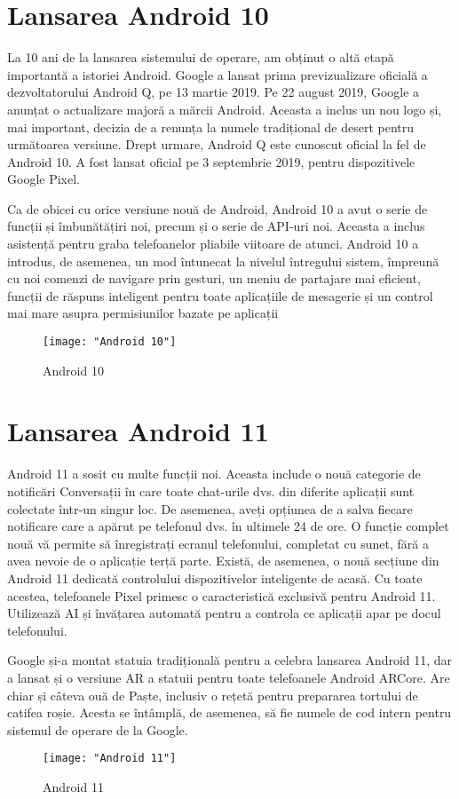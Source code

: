 \documentclass[a4paper,12pt]{amsbook}
\begin{document}
\chapter{\Large Lansarea Android 10}
\par
La 10 ani de la lansarea sistemului de operare, am obținut o altă etapă importantă a istoriei Android. Google a lansat prima previzualizare oficială a dezvoltatorului Android Q, pe 13 martie 2019. Pe 22 august 2019, Google a anunțat o actualizare majoră a mărcii Android. Aceasta a inclus un nou logo și, mai important, decizia de a renunța la numele tradițional de desert pentru următoarea versiune. Drept urmare, Android Q este cunoscut oficial la fel de Android 10. A fost lansat oficial pe 3 septembrie 2019, pentru dispozitivele Google Pixel.
\par
Ca de obicei cu orice versiune nouă de Android, Android 10 a avut o serie de funcții și îmbunătățiri noi, precum și o serie de API-uri noi. Aceasta a inclus asistență pentru graba telefoanelor pliabile viitoare de atunci. Android 10 a introdus, de asemenea, un mod întunecat la nivelul întregului sistem, împreună cu noi comenzi de navigare prin gesturi, un meniu de partajare mai eficient, funcții de răspuns inteligent pentru toate aplicațiile de mesagerie și un control mai mare asupra permisiunilor bazate pe aplicații
\begin{figure}[h]
	\centering
	\texttt{[image: "Android 10"]}
	\caption[Android 10]{Android 10}
	\label{fig:android-10}
\end{figure}
\par
\chapter{\Large Lansarea Android 11}
\par
Android 11 a sosit cu multe funcții noi. Aceasta include o nouă categorie de notificări Conversații în care toate chat-urile dvs. din diferite aplicații sunt colectate într-un singur loc. De asemenea, aveți opțiunea de a salva fiecare notificare care a apărut pe telefonul dvs. în ultimele 24 de ore. O funcție complet nouă vă permite să înregistrați ecranul telefonului, completat cu sunet, fără a avea nevoie de o aplicație terță parte. Există, de asemenea, o nouă secțiune din Android 11 dedicată controlului dispozitivelor inteligente de acasă.
Cu toate acestea, telefoanele Pixel primesc o caracteristică exclusivă pentru Android 11. Utilizează AI și învățarea automată pentru a controla ce aplicații apar pe docul telefonului.
\par
Google și-a montat statuia tradițională pentru a celebra lansarea Android 11, dar a lansat și o versiune AR a statuii pentru toate telefoanele Android ARCore. Are chiar și câteva ouă de Paște, inclusiv o rețetă pentru prepararea tortului de catifea roșie. Acesta se întâmplă, de asemenea, să fie numele de cod intern pentru sistemul de operare de la Google.
\begin{figure}[h]
	\centering
	\texttt{[image: "Android 11"]}
	\caption[Android 11]{Android 11}
	\label{fig:android-11}
\end{figure}
\end{document}
